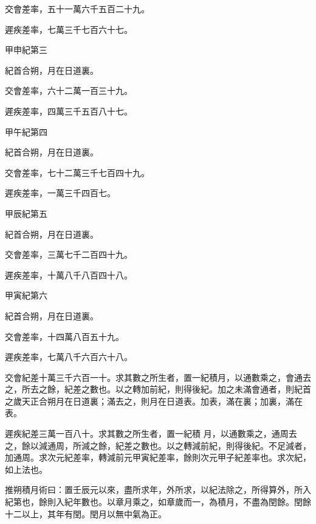 \begin{pinyinscope}
 交會差率，五十一萬六千五百二十九。



 遲疾差率，七萬三千七百六十七。



 甲申紀第三



 紀首合朔，月在日道裏。



 交會差率，六十二萬一百三十九。



 遲疾差率，四萬三千五百八十七。



 甲午紀第四



 紀首合朔，月在日道裏。



 交會差率，七十二萬三千七百四十九。



 遲疾差率，一萬三千四百七。



 甲辰紀第五



 紀首合朔，月在日道裏。



 交會差率，三萬七千二百四十九。



 遲疾差率，十萬八千八百四十八。



 甲寅紀第六



 紀首合朔，月在日道裏。



 交會差率，十四萬八百五十九。



 遲疾差率，七萬八千六百六十八。



 交會紀差十萬三千六百一十。求其數之所生者，置一紀積月，以通數乘之，會通去之，所去之餘，紀差之數也。以之轉加前紀，則得後紀。加之未滿會通者，則紀首之歲天正合朔月在日道裏；滿去之，則月在日道表。加表，滿在裏；加裏，滿在表。



 遲疾紀差三萬一百八十。求其數之所生者，置一紀積
 月，以通數乘之，通周去之，餘以減通周，所減之餘，紀差之數也。以之轉減前紀，則得後紀。不足減者，加通周。求次元紀差率，轉減前元甲寅紀差率，餘則次元甲子紀差率也。求次紀，如上法也。



 推朔積月術曰：置壬辰元以來，盡所求年，外所求，以紀法除之，所得算外，所入紀第也，餘則入紀年數也。以章月乘之，如章歲而一，為積月，不盡為閏餘。閏餘十二以上，其年有閏。閏月以無中氣為正。




\end{pinyinscope}
